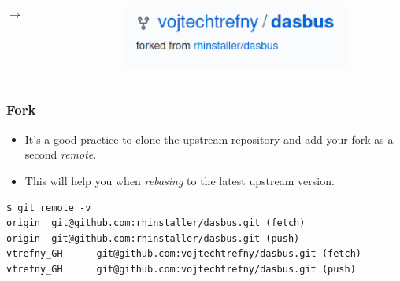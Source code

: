 \documentclass[aspectratio=169]{beamer}              %
\begin{document}
\begin{frame}
\begin{columns}
\begin{column}{0.03\textwidth}
\begin{center}
$\rightarrow$
\end{center}
\end{column}

\begin{column}{0.30\textwidth}
\begin{figure}[ht!]
	\begin{center}
  	  \includegraphics[width=0.9\textwidth]{img/gh-fork-2.png}
	\end{center}
\end{figure}
\end{column}
\end{columns}

\end{frame}

\begin{frame}[fragile]
	\frametitle{Fork}
	
	\begin{block}{}
		\begin{itemize}
			\item It's a good practice to clone the upstream repository and add your fork as a second \emph{remote}.
			\item This will help you when \emph{rebasing} to the latest upstream version.
		\end{itemize}
	\end{block}
	
\begin{lstlisting}[frame=none, basicstyle=\ttfamily\small, columns=fullflexible, keepspaces=true]
$ git remote -v
origin  git@github.com:rhinstaller/dasbus.git (fetch)
origin  git@github.com:rhinstaller/dasbus.git (push)
vtrefny_GH      git@github.com:vojtechtrefny/dasbus.git (fetch)
vtrefny_GH      git@github.com:vojtechtrefny/dasbus.git (push)
\end{lstlisting}

\end{frame}
\end{document}
